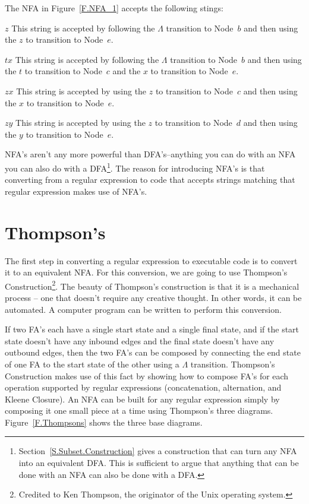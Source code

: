 \documentclass[letterpaper,12pt,openany,reqno]{book}%
\newenvironment{mydesc}[1][9em]
  {
     \begin{basedescript}
     {
      \renewcommand{\makelabel}[1]{\bfseries##1}
      \desclabelwidth{ #1 }
      \desclabelstyle{\multilinelabel}
     }
  }
  {
     \end{basedescript}%
  }
\begin{document}
The NFA in Figure~\ref{F.NFA_1} accepts the following stings:
\begin{mydesc}[2em]
	\item[$z$] This string is accepted by following the $\Lambda$ transition to Node~$b$ and then using the $z$ to transition to Node~$e$.
	\item[$tx$] This string is accepted by following the $\Lambda$ transition to Node~$b$ and then using the $t$ to transition to Node~$c$ and the $x$ to transition to Node~$e$.
	\item[$zx$] This string is accepted by using the $z$ to transition to Node~$c$ and then using the $x$ to transition to Node~$e$.
	\item[$zy$] This string is accepted by using the $z$ to transition to Node~$d$ and then using the $y$ to transition to Node~$e$.
\end{mydesc}

NFA's aren't any more powerful than DFA's--anything you can do with an NFA you can also do with a DFA\footnote{Section~\ref{S.Subset.Construction} gives a construction that can turn any NFA into an equivalent DFA. This is sufficient to argue that anything that can be done with an NFA can also be done with a DFA.}. The reason for introducing NFA's is that converting from a regular expression to code that accepts strings matching that regular expression makes use of NFA's.

\section{Thompson's}

The first step in converting a regular expression to executable code is to convert it to an equivalent NFA. For this conversion, we are going to use Thompson's Construction\footnote{Credited to Ken Thompson, the originator of the Unix operating system.}. The beauty of Thompson's construction is that it is a mechanical process -- one that doesn't require any creative thought. In other words, it can be automated. A computer program can be written to perform this conversion.

If two FA's each have a single start state and a single final state, and if the start state doesn't have any inbound edges and the final state doesn't have any outbound edges, then the two FA's can be composed by connecting the end state of one FA to the start state of the other using a $\Lambda$ transition. Thompson's Construction makes use of this fact by showing how to compose FA's for each operation supported by regular expressions (concatenation, alternation, and Kleene Closure). An NFA can be built for any regular expression simply by composing it one small piece at a time using Thompson's three diagrams. Figure~\ref{F.Thompsons} shows the three base diagrams.
\end{document}
